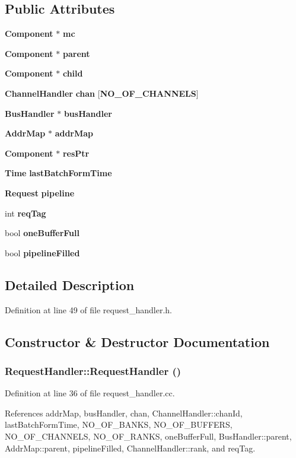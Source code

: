 \subsection*{Public Attributes}
\begin{CompactItemize}
\item 
{\bf Component} $\ast$ {\bf mc}
\item 
{\bf Component} $\ast$ {\bf parent}
\item 
{\bf Component} $\ast$ {\bf child}
\item 
{\bf ChannelHandler} {\bf chan} [{\bf NO\_\-OF\_\-CHANNELS}]
\item 
{\bf BusHandler} $\ast$ {\bf busHandler}
\item 
{\bf AddrMap} $\ast$ {\bf addrMap}
\item 
{\bf Component} $\ast$ {\bf resPtr}
\item 
{\bf Time} {\bf lastBatchFormTime}
\item 
{\bf Request} {\bf pipeline}
\item 
int {\bf reqTag}
\item 
bool {\bf oneBufferFull}
\item 
bool {\bf pipelineFilled}
\end{CompactItemize}


\subsection{Detailed Description}


Definition at line 49 of file request\_\-handler.h.

\subsection{Constructor \& Destructor Documentation}
\subsubsection[{RequestHandler}]{\setlength{\rightskip}{0pt plus 5cm}RequestHandler::RequestHandler ()}\label{classRequestHandler_5f47febd4b90dd6fc49b1f8303247c69}




Definition at line 36 of file request\_\-handler.cc.

References addrMap, busHandler, chan, ChannelHandler::chanId, lastBatchFormTime, NO\_\-OF\_\-BANKS, NO\_\-OF\_\-BUFFERS, NO\_\-OF\_\-CHANNELS, NO\_\-OF\_\-RANKS, oneBufferFull, BusHandler::parent, AddrMap::parent, pipelineFilled, ChannelHandler::rank, and reqTag.
